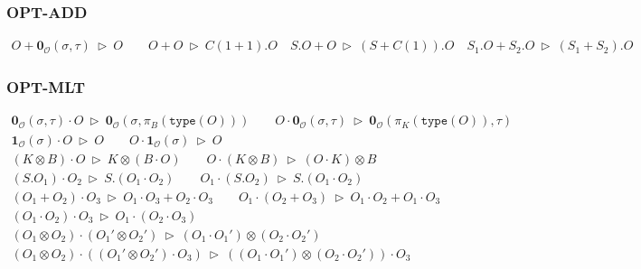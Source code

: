 \documentclass[manuscript, review, timestamp]{acmart}
\newcommand*{\type}{\texttt{type}}
\newcommand*{\reduce}{\ \triangleright\ }
\begin{document}
\subsubsection*{\textsf{OPT-ADD}}
\begin{gather*}
  O + \mathbf{0}_\mathcal{O}(\sigma, \tau) \reduce O
  \qquad
  O + O \reduce C(1 + 1).O
  \quad
  S.O + O \reduce (S + C(1)).O
  \quad
  S_1.O + S_2.O \reduce (S_1 + S_2).O
\end{gather*}

\subsubsection*{\textsf{OPT-MLT}}
\begin{gather*}
  \mathbf{0}_\mathcal{O}(\sigma, \tau) \cdot O \reduce \mathbf{0}_\mathcal{O}(\sigma, \pi_B(\type(O)))
  \qquad
  O \cdot \mathbf{0}_\mathcal{O}(\sigma, \tau) \reduce \mathbf{0}_\mathcal{O}(\pi_K(\type(O)), \tau) \\
  \mathbf{1}_\mathcal{O}(\sigma) \cdot O \reduce O
  \qquad
  O \cdot \mathbf{1}_\mathcal{O}(\sigma) \reduce O \\
  (K \otimes B) \cdot O \reduce K \otimes (B \cdot O)
  \qquad
  O \cdot (K \otimes B) \reduce (O \cdot K) \otimes B\\
  (S.O_1) \cdot O_2 \reduce S.(O_1 \cdot O_2)
  \qquad
  O_1 \cdot (S.O_2) \reduce S.(O_1 \cdot O_2) \\
  (O_1 + O_2) \cdot O_3 \reduce O_1 \cdot O_3 + O_2 \cdot O_3
  \qquad
  O_1 \cdot (O_2 + O_3) \reduce O_1 \cdot O_2 + O_1 \cdot O_3 \\
  (O_1 \cdot O_2) \cdot O_3 \reduce O_1 \cdot (O_2 \cdot O_3) \\
  (O_1 \otimes O_2) \cdot (O_1' \otimes O_2') \reduce (O_1 \cdot O_1') \otimes (O_2 \cdot O_2') \\
  (O_1 \otimes O_2) \cdot ((O_1' \otimes O_2') \cdot O_3) \reduce ((O_1 \cdot O_1') \otimes (O_2 \cdot O_2')) \cdot O_3
\end{gather*}
\end{document}
